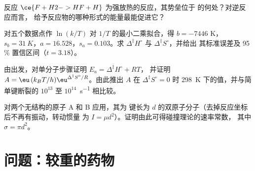 \begin{exercise}[$\star\star$]\label{exo:b3:rate-theories:9}
反应 $\ce{F + H2 -> HF + H}$ 为强放热的反应，其势垒位于
的何处？对逆反应而言，
给予反应物的哪种形式的能量最能促进它？
\end{exercise}

\begin{exercise}[$\star\star\star$]\label{exo:b3:rate-theories:10}
对五个数据点作 $\ln(k/T)$ 对 $1/T$ 的最小二乘拟合，得 $b = -7446$ K，
$s_b = \qty{31}{K}$，$a = 16.528$，$s_a = 0.103$。求 $\Delta^{\ddagger}H^\circ$ 与 $\Delta^{\ddagger}S^\circ$，并给出
其标准误差及 95\,\% 置信区间（$t = 3.18$）。
\end{exercise}

\begin{exercise}[$\star\star\star$]\label{exo:b3:rate-theories:11}
由出发，对单分子步骤证明 $E_a = \Delta^{\ddagger}H^\circ + RT$，
并证明 $A = \eu\,(k_BT/h)\eu^{\Delta^{\ddagger}S^\circ/R}$。由此推出 $A$ 在 $\Delta^{\ddagger}S^\circ = 0$ 时
\qty{298}{K} 下的值，并与简单键断裂的 $10^{13}$ 至 $10^{14}$~\unit{s^{-1}} 相比较。
\end{exercise}

\begin{exercise}[$\star\star\star$]\label{exo:b3:rate-theories:12}
对两个无结构的原子 A 和 B 应用，其为
键长为 $d$ 的双原子分子（去掉反应坐标后不再有振动，转动惯量
为 $I = \mu d^2$）。证明由此可得碰撞理论的速率常数，
其中 $\sigma = \pi d^2$。
\end{exercise}

\section{问题：较重的药物}

